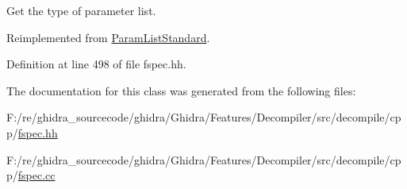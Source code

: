 Get the type of parameter list. 



Reimplemented from \mbox{\hyperlink{class_param_list_standard_a37193293ffb24b1206944e35ef64973c}{Param\+List\+Standard}}.



Definition at line 498 of file fspec.\+hh.



The documentation for this class was generated from the following files\+:\begin{DoxyCompactItemize}
\item 
F\+:/re/ghidra\+\_\+sourcecode/ghidra/\+Ghidra/\+Features/\+Decompiler/src/decompile/cpp/\mbox{\hyperlink{fspec_8hh}{fspec.\+hh}}\item 
F\+:/re/ghidra\+\_\+sourcecode/ghidra/\+Ghidra/\+Features/\+Decompiler/src/decompile/cpp/\mbox{\hyperlink{fspec_8cc}{fspec.\+cc}}\end{DoxyCompactItemize}
